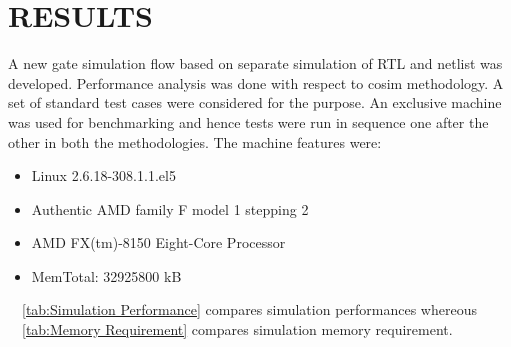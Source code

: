 \chapter{RESULTS}
\label{chap:results.tex}
A new gate simulation flow based on separate simulation of RTL and netlist was developed. Performance analysis was done with respect to cosim methodology. A set of standard test cases were considered for the purpose. An exclusive machine was used for benchmarking and hence tests were run in sequence one after the other in both the methodologies. The machine features were:
\begin{itemize}
\item Linux 2.6.18-308.1.1.el5
\item Authentic AMD family F model 1 stepping 2
\item AMD FX(tm)-8150 Eight-Core Processor
\item MemTotal:     32925800 kB
\end{itemize}  

~\tablename{~\ref{tab:Simulation Performance}} compares simulation performances whereous ~\tablename{~\ref{tab:Memory Requirement}} compares simulation memory requirement.


\newpage
